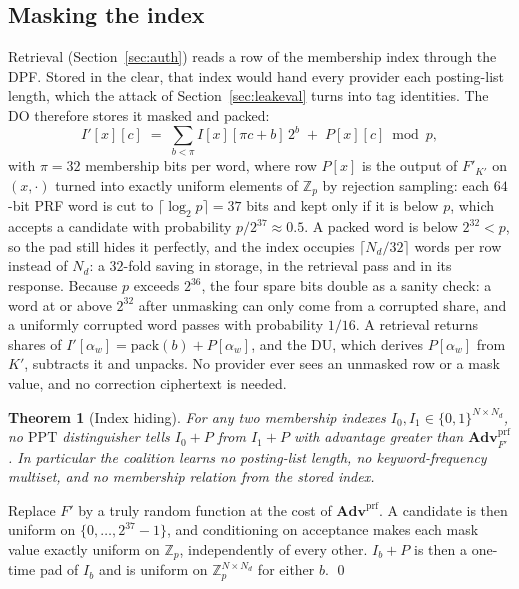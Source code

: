 \documentclass[a4paper,fleqn]{cas-sc}
\newtheorem{theorem}{Theorem}
\newcommand{\PPT}{\mathrm{PPT}}
\newcommand{\advPRF}{\mathbf{Adv}^{\mathrm{prf}}}
\begin{document}
\subsection{Masking the index}
\label{sec:mask}
Retrieval (Section~\ref{sec:auth}) reads a row of the membership index through
the DPF. Stored in the clear, that index would hand every provider each
posting-list length, which the attack of Section~\ref{sec:leakeval} turns into
tag identities. The DO therefore stores it masked and packed:
\[
I'[x][c]\;=\;\sum_{b<\pi} I[x][\pi c+b]\,2^b \;+\; P[x][c] \bmod p ,
\]
with $\pi=32$ membership bits per word, where row $P[x]$ is the output of
$F'_{K'}$ on $(x,\cdot)$ turned into exactly uniform elements of
$\mathbb{Z}_p$ by rejection sampling: each $64$-bit PRF word is cut to
$\lceil\log_2 p\rceil=37$ bits and kept only if it is below $p$, which accepts
a candidate with probability $p/2^{37}\approx0.5$. A packed word is below
$2^{32}<p$, so the pad still hides it perfectly, and the index occupies
$\lceil N_d/32\rceil$ words per row instead of $N_d$: a $32$-fold saving in
storage, in the retrieval pass and in its response. Because $p$ exceeds $2^{36}$,
the four spare bits double as a sanity check: a word at or above $2^{32}$ after
unmasking can only come from a corrupted share, and a uniformly corrupted word
passes with probability $1/16$. A retrieval returns shares of
$I'[\alpha_w]=\mathrm{pack}(b)+P[\alpha_w]$, and the DU, which derives
$P[\alpha_w]$ from $K'$, subtracts it and unpacks. No provider ever sees an
unmasked row or a mask value, and no correction ciphertext is needed.

\begin{theorem}[Index hiding]
\label{thm:mask}
For any two membership indexes $I_0,I_1\in\{0,1\}^{N\times N_d}$, no $\PPT$
distinguisher tells $I_0+P$ from $I_1+P$ with advantage greater than
$\advPRF_{F'}$. In particular the coalition learns no posting-list length, no
keyword-frequency multiset, and no membership relation from the stored index.
\end{theorem}
\begin{pf}
Replace $F'$ by a truly random function at the cost of $\advPRF$. A candidate
is then uniform on $\{0,\dots,2^{37}-1\}$, and conditioning on acceptance makes
each mask value exactly uniform on $\mathbb{Z}_p$, independently of every
other. $I_b+P$ is then a one-time pad of $I_b$ and is uniform on
$\mathbb{Z}_p^{N\times N_d}$ for either $b$. \qed
\end{pf}
\end{document}
